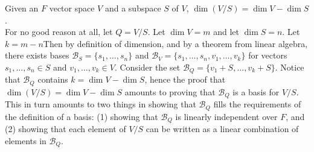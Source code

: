 \documentclass{article}
\begin{document}
 Given an $F$ vector space $V$ and a subspace $S$ of $V$, $\dim(V/S) = \dim V - \dim S$.\\
 For no good reason at all, let $Q = V/S$. Let $\dim V = m$ and let $\dim S = n$. Let $k = m - n$Then by definition of dimension, and by a theorem from linear algebra, there exists bases $\mathcal{B}_S = \{s_1,\dots,s_n\}$ and $\mathcal{B}_V = \{s_1,\dots, s_n, v_1,\dots, v_k\}$ for vectors $s_1,\dots, s_n\in S$ and $v_1,\dots, v_k \in V$. Consider the set $\mathcal{B}_Q = \{v_1 + S,\dots, v_k + S\}$. Notice that $\mathcal{B}_Q$ contains $k = \dim V - \dim S$, hence the proof that $\dim(V/S) = \dim V - \dim S$ amounts to proving that $\mathcal{B}_Q$ is a basis for $V/S$. This in turn amounts to two things in showing that $\mathcal{B}_Q$ fills the requirements of the definition of a basis: (1) showing that $\mathcal{B}_Q$ is linearly independent over $F$, and (2) showing that each element of $V/S$ can be written as a linear combination of elements in $\mathcal{B}_Q$.
\end{document}
